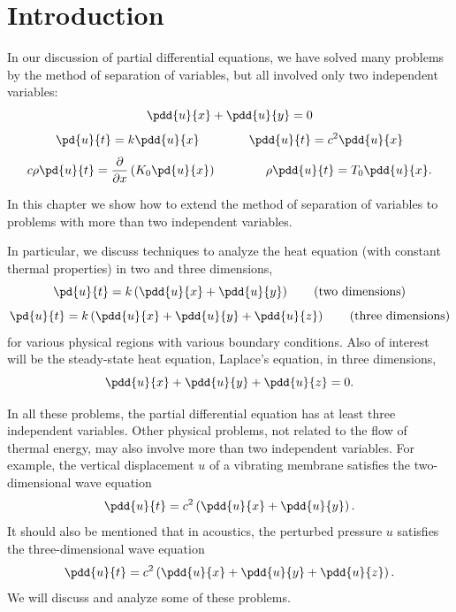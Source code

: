 \section{Introduction}
\label{sec:7.1}

In our discussion of partial differential equations, we have solved many problems by the method of separation of variables, but all involved only two independent variables:
\[
\pdd{u}{x} + \pdd{u}{y} = 0
\]
\[
\pd{u}{t} = k\pdd{u}{x} \qquad\qquad \pdd{u}{t} = c^2\pdd{u}{x}
\]
\[
c\rho\pd{u}{t} = \frac{\partial}{\partial x}\left(K_0\pd{u}{x}\right) \qquad\qquad \rho\pdd{u}{t} = T_0\pdd{u}{x}.
\]

In this chapter we show how to extend the method of separation of variables to problems with more than two independent variables.

In particular, we discuss techniques to analyze the heat equation (with constant thermal properties) in two and three dimensions,
\begin{equation}
\pd{u}{t} = k\left(\pdd{u}{x} + \pdd{u}{y}\right) \qquad\text{(two dimensions)}
\label{eq:7.1.1}
\end{equation}
\begin{equation}
\pd{u}{t} = k\left(\pdd{u}{x} + \pdd{u}{y} + \pdd{u}{z}\right) \qquad\text{(three dimensions)}
\label{eq:7.1.2}
\end{equation}
for various physical regions with various boundary conditions.  Also of interest will be the steady-state heat equation, Laplace's equation, in three dimensions,
\[
\pdd{u}{x} + \pdd{u}{y} + \pdd{u}{z} = 0.
\]

In all these problems, the partial differential equation has at least three independent variables.  Other physical problems, not related to the flow of thermal energy, may also involve more than two independent variables.  For example, the vertical displacement $u$ of a vibrating membrane satisfies the two-dimensional wave equation
\[
\pdd{u}{t} = c^2\left(\pdd{u}{x} + \pdd{u}{y}\right).
\]
It should also be mentioned that in acoustics, the perturbed pressure $u$ satisfies the three-dimensional wave equation
\[
\pdd{u}{t} = c^2\left(\pdd{u}{x} + \pdd{u}{y} + \pdd{u}{z}\right).
\]
We will discuss and analyze some of these problems.
